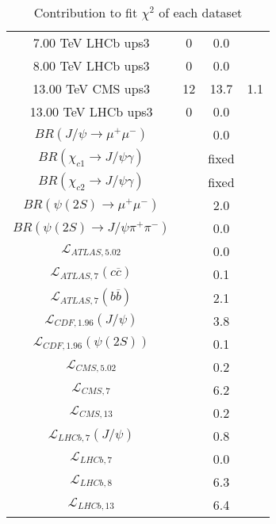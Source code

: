 \begin{table}[h!]
\begin{tabular}{c|c|c|c}
7.00 TeV LHCb ups3 & 0 & 0.0 &  \\
8.00 TeV LHCb ups3 & 0 & 0.0 &  \\
13.00 TeV CMS ups3 & 12 & 13.7 & 1.1 \\
13.00 TeV LHCb ups3 & 0 & 0.0 &  \\
\hline
$BR(J/\psi\rightarrow\mu^+\mu^-)$ &  & 0.0 &  \\
$BR(\chi_{c1}\rightarrow J/\psi\gamma)$ &  & fixed & \\
$BR(\chi_{c2}\rightarrow J/\psi\gamma)$ &  & fixed & \\
$BR(\psi(2S)\rightarrow\mu^+\mu^-)$ &  & 2.0 &  \\
$BR(\psi(2S)\rightarrow J/\psi\pi^+\pi^-)$ &  & 0.0 &  \\
$\mathcal L_{ATLAS,5.02}$ &  & 0.0 &  \\
$\mathcal L_{ATLAS,7}(c\overline c)$ &  & 0.1 &  \\
$\mathcal L_{ATLAS,7}(b\overline b)$ &  & 2.1 &  \\
$\mathcal L_{CDF,1.96}(J/\psi)$ &  & 3.8 &  \\
$\mathcal L_{CDF,1.96}(\psi(2S))$ &  & 0.1 &  \\
$\mathcal L_{CMS,5.02}$ &  & 0.2 &  \\
$\mathcal L_{CMS,7}$ &  & 6.2 &  \\
$\mathcal L_{CMS,13}$ &  & 0.2 &  \\
$\mathcal L_{LHCb,7}(J/\psi)$ &  & 0.8 &  \\
$\mathcal L_{LHCb,7}$ &  & 0.0 &  \\
$\mathcal L_{LHCb,8}$ &  & 6.3 &  \\
$\mathcal L_{LHCb,13}$ &  & 6.4 &  \\
\end{tabular}
\caption{Contribution to fit $\chi^2$ of each dataset}
\end{table}
